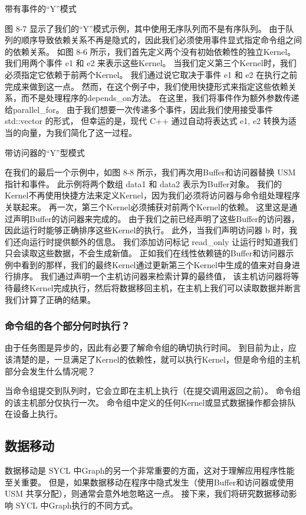 {\color{red} 带有事件的“Y”模式}

图 8-7 显示了我们的“Y”模式示例，其中使用无序队列而不是有序队列。 
由于队列的顺序导致依赖关系不再是隐式的，因此我们必须使用事件显式指定命令组之间的依赖关系。 
如图 8-6 所示，我们首先定义两个没有初始依赖性的独立Kernel。 我们用两个事件 e1 和 e2 来表示这些Kernel。 
当我们定义第三个Kernel时，我们必须指定它依赖于前两个Kernel。 
我们通过说它取决于事件 e1 和 e2 在执行之前完成来做到这一点。 
然而，在这个例子中，我们使用快捷形式来指定这些依赖关系，而不是处理程序的depends\_on方法。 
在这里，我们将事件作为额外参数传递给parallel\_for。 
由于我们想要一次传递多个事件，因此我们使用接受事件 std::vector 的形式，
但幸运的是，现代 C++ 通过自动将表达式 {e1, e2} 转换为适当的向量，为我们简化了这一过程。

{\color{red} 带访问器的“Y”型模式}

在我们的最后一个示例中，如图 8-8 所示，我们再次用Buffer和访问器替换 USM 指针和事件。 
此示例将两个数组 data1 和 data2 表示为Buffer对象。 
我们的Kernel不再使用快捷方法来定义Kernel，因为我们必须将访问器与命令组处理程序关联起来。 
再一次，第三个Kernel必须捕获对前两个Kernel的依赖。 这里这是通过声明Buffer的访问器来完成的。 
由于我们之前已经声明了这些Buffer的访问器，因此运行时能够正确排序这些Kernel的执行。 
此外，当我们声明访问器 b 时，我们还向运行时提供额外的信息。 
我们添加访问标记 read\_only 让运行时知道我们只会读取这些数据，不会生成新值。 
正如我们在线性依赖链的Buffer和访问器示例中看到的那样，我们的最终Kernel通过更新第三个Kernel中生成的值来对自身进行排序。 
我们通过声明一个主机访问器来检索计算的最终值，
该主机访问器将等待最终Kernel完成执行，然后将数据移回主机，在主机上我们可以读取数据并断言我们计算了正确的结果。

\subsubsection{命令组的各个部分何时执行？}
由于任务图是异步的，因此有必要了解命令组的确切执行时间。 
到目前为止，应该清楚的是，一旦满足了Kernel的依赖性，就可以执行Kernel，但是命令组的主机部分会发生什么情况呢？

当命令组提交到队列时，它会立即在主机上执行（在提交调用返回之前）。 
命令组的该主机部分仅执行一次。 命令组中定义的任何Kernel或显式数据操作都会排队在设备上执行。

\subsection{数据移动}
数据移动是 SYCL 中Graph的另一个非常重要的方面，这对于理解应用程序性能至关重要。 
但是，如果数据移动在程序中隐式发生（使用Buffer和访问器或使用 USM 共享分配），则通常会意外地忽略这一点。 
接下来，我们将研究数据移动影响 SYCL 中Graph执行的不同方式。

